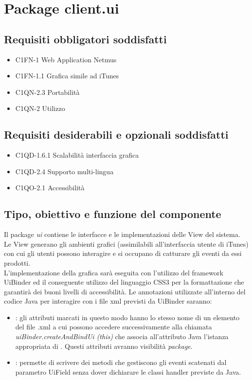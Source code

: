 \newpage
\section{Package client.ui} %
\subsection*{Requisiti obbligatori soddisfatti}
\begin{itemize}
	\item C1FN-1 Web Application Netmus
	\item C1FN-1.1 Grafica simile ad iTunes
	\item C1QN-2.3 Portabilit\`a
	\item C1QN-2 Utilizzo
\end{itemize}
\subsection*{Requisiti desiderabili e opzionali soddisfatti}
\begin{itemize}
    \item C1QD-1.6.1 Scalabilit\`a interfaccia grafica
    \item C1QD-2.4 Supporto multi-lingua
    \item C1QO-2.1 Accessibilit\`a
\end{itemize}
\subsection*{Tipo, obiettivo e funzione del componente}
Il package \emph{ui} contiene le interfacce e le implementazioni delle View del
sistema. Le View generano gli ambienti grafici (assimilabili all'interfaccia
utente di iTunes) con cui gli utenti possono interagire e si occupano di
catturare gli eventi da essi prodotti. \\
L'implementazione della grafica sar\`a eseguita con l'utilizzo del framework
UiBinder ed il conseguente utilizzo del linguaggio CSS3 per la formattazione
che garantir\`a dei buoni livelli di accessibilit\`a.
Le annotazioni utilizzate all'interno del codice Java per interagire con i file
xml previsti da UiBinder saranno:
\begin{itemize}
  \item {}: gli attributi marcati in questo modo hanno lo stesso nome
  di un elemento del file .xml a cui possono accedere successivamente alla
  chiamata \emph{uiBinder.createAndBindUi (this)} che associa all'attributo Java
  l'istanza appropriata di . Questi attributi avranno
  visibilit\`a \emph{package}.
  \item {}: permette di scrivere dei metodi
  che gestiscono gli eventi scatenati dal parametro UiField senza
  dover dichiarare le classi handler previste da Java.
\end{itemize}  
